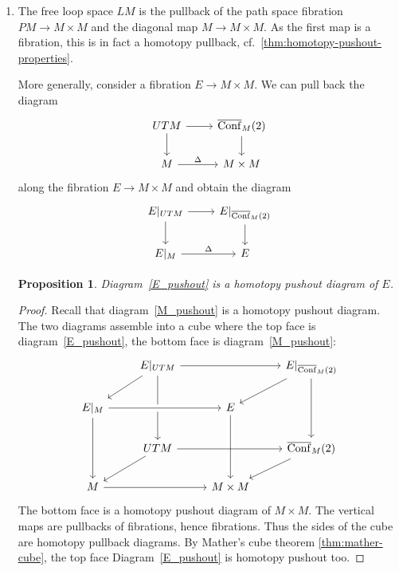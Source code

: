 \documentclass{scrartcl}
\theoremstyle{plain}
\newtheorem{proposition}[theorem]{Proposition}
\theoremstyle{definition}
\DeclareMathOperator{\cConf}{\overline{Conf}}
\begin{document}
\begin{enumerate}[(1)]
    \item 
The free loop space $LM$ is the pullback of the path space fibration $PM \to M\times M$ and the diagonal map $M\to M\times M$. As the first map is a fibration, this is in fact a homotopy pullback, cf.~\cref{thm:homotopy-pushout-properties}. 

More generally, consider a fibration $E\to M\times M$. We can pull back the diagram 
\begin{equation}\label{M_pushout}
    \begin{tikzcd}
        UTM \dar\rar & \cConf_M(2)\dar \\
        M \rar["\Delta"] & M\times M
    \end{tikzcd}
\end{equation}
along the fibration $E\to M\times M$ and obtain the diagram
\begin{equation}\label{E_pushout}
    \begin{tikzcd}
        E|_{UTM} \dar\rar & E|_{\cConf_M(2)}\dar \\
        E|_M \rar["\Delta"] & E
    \end{tikzcd}
\end{equation}
\begin{proposition}\label{lem:pullback_cube}
    Diagram~\ref{E_pushout} is a homotopy pushout diagram of $E$. 
\end{proposition}
\begin{proof}
Recall that diagram~\ref{M_pushout} is a homotopy pushout diagram. The two diagrams assemble into a cube where the top face is diagram~\ref{E_pushout}, the bottom face is diagram~\ref{M_pushout}:
\begin{equation}
\begin{tikzcd}
    & E|_{UTM}\ar{dd}\ar{dl} \ar{rr} && E|_{\cConf_M(2)}\ar{dd}\ar{dl} \\
    E|_M \ar[crossing over]{rr}\ar{dd} && E \ar[crossing over]{dd}& \\
    & UTM \ar{dl}\ar{rr} && \cConf_M(2)\ar{dl} \\
    M \ar{rr} && M\times M &
\end{tikzcd}
\end{equation}
The bottom face is a homotopy pushout diagram of $M\times M$. The vertical maps are pullbacks of fibrations, hence fibrations. Thus the sides of the cube are homotopy pullback diagrams. By Mather's cube theorem \cref{thm:mather-cube},  the top face Diagram~\ref{E_pushout} is homotopy pushout too. 
\end{proof}


\end{enumerate}
\end{document}
